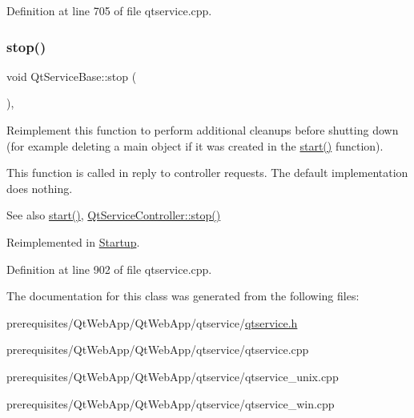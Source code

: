Definition at line 705 of file qtservice.\+cpp.

\mbox{\label{class_qt_service_base_a8d52c1b8fd06b50bdc0a0c6f9936a68e}} 
\subsubsection{\texorpdfstring{stop()}{stop()}}
{\footnotesize\ttfamily void Qt\+Service\+Base\+::stop (\begin{DoxyParamCaption}{ }\end{DoxyParamCaption})\hspace{0.3cm}{\ttfamily [protected]}, {\ttfamily [virtual]}}

Reimplement this function to perform additional cleanups before shutting down (for example deleting a main object if it was created in the \mbox{\hyperlink{class_qt_service_base_adbc0cd621b41bd3a6a1f62fda432e9e4}{start()}} function).

This function is called in reply to controller requests. The default implementation does nothing.

\begin{DoxySeeAlso}{See also}
\mbox{\hyperlink{class_qt_service_base_adbc0cd621b41bd3a6a1f62fda432e9e4}{start()}}, \mbox{\hyperlink{class_qt_service_controller_ad06afa647666769e309474b18bf7cf90}{Qt\+Service\+Controller\+::stop()}} 
\end{DoxySeeAlso}


Reimplemented in \mbox{\hyperlink{class_startup_a7c9c2aff06377779ce1f801836bd11b3}{Startup}}.



Definition at line 902 of file qtservice.\+cpp.



The documentation for this class was generated from the following files\+:\begin{DoxyCompactItemize}
\item 
prerequisites/\+Qt\+Web\+App/\+Qt\+Web\+App/qtservice/\mbox{\hyperlink{qtservice_8h}{qtservice.\+h}}\item 
prerequisites/\+Qt\+Web\+App/\+Qt\+Web\+App/qtservice/qtservice.\+cpp\item 
prerequisites/\+Qt\+Web\+App/\+Qt\+Web\+App/qtservice/qtservice\+\_\+unix.\+cpp\item 
prerequisites/\+Qt\+Web\+App/\+Qt\+Web\+App/qtservice/qtservice\+\_\+win.\+cpp\end{DoxyCompactItemize}
